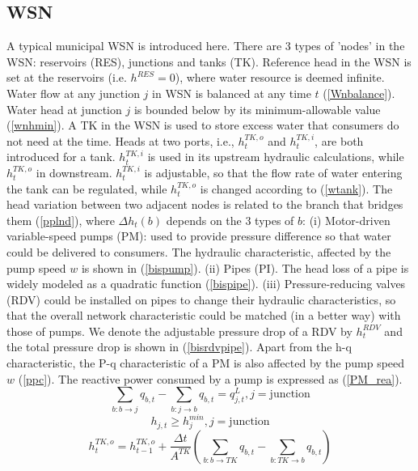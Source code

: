 \documentclass[journal,twoside,web]{ieeecolor}
\begin{document}
\subsection{WSN}
A typical municipal WSN \cite{waterNet} is introduced here.
There are 3 types of 'nodes' in the WSN: reservoirs (RES), junctions and tanks (TK).
Reference head in the WSN is set at the reservoirs (i.e. $h^{RES}=0$), where water resource is deemed infinite.
Water flow at any junction $j$ in WSN is balanced at any time $t$ (\ref{Wnbalance}).
Water head at junction $j$ is bounded below by its minimum-allowable value (\ref{wnhmin}).
A TK in the WSN is used to store excess water that consumers do not need at the time.
Heads at two ports, i.e., $h^{TK,o}_t$ and $h^{TK,i}_t$, are both introduced for a tank.
$h^{TK,i}_t$ is used in its upstream hydraulic calculations, while $h^{TK,o}_t$ in downstream.
$h^{TK,i}_t$ is adjustable, so that the flow rate of water entering the tank can be regulated, while $h^{TK,o}_t$ is changed according to (\ref{wtank}).
The head variation between two adjacent nodes is related to the branch that bridges them (\ref{pplnd}), where $\Delta h_t(b)$ depends on the 3 types of $b$:
(i) Motor-driven variable-speed pumps (PM): used to provide pressure difference so that water could be delivered to consumers.
The hydraulic characteristic, affected by the pump speed $w$ is shown in (\ref{bispump}).
(ii) Pipes (PI). The head loss of a pipe is widely modeled as a quadratic function (\ref{bispipe}).
(iii) Pressure-reducing valves (RDV) could be installed on pipes to change their hydraulic characteristics, so that the overall network characteristic could be matched (in a better way) with those of pumps.
We denote the adjustable pressure drop of a RDV by $h^{RDV}_t$ and the total pressure drop is shown in (\ref{bisrdvpipe}).
Apart from the h-q characteristic, the P-q characteristic of a PM is also affected by the pump speed $w$ (\ref{ppc}).
The reactive power consumed by a pump is expressed as (\ref{PM_rea}).
\begin{equation}\label{Wnbalance}
    \sum_{b:b\rightarrow j} q_{b,t}-\sum_{b:j\rightarrow b} q_{b,t}=q^L_{j,t}, j = \text{junction}
\end{equation}
\begin{equation}\label{wnhmin}
    h_{j,t} \ge h_j^{min}, j = \text{junction}
\end{equation}
\begin{equation}\label{wtank}
    h^{TK,o}_{t}=h^{TK,o}_{t-1}+\frac{\Delta t}{A^{TK}}(\sum_{b:b\rightarrow TK} q_{b,t} - \sum_{b:TK\rightarrow b} q_{b,t})
\end{equation}
\end{document}
